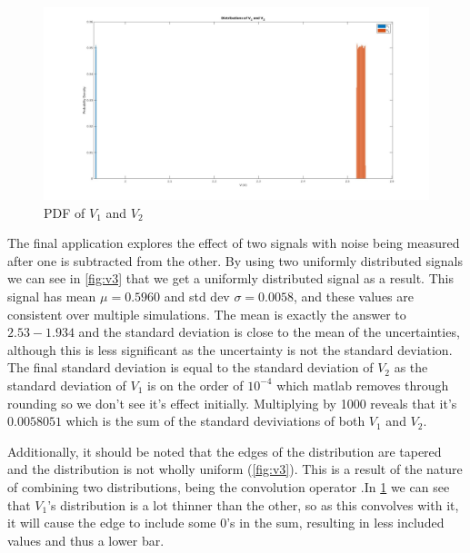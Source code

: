 \documentclass[a4paper, 12pt]{article}
\begin{document}
            \begin{figure}[!t]
                \centering
                \includegraphics[width=\textwidth]{sigDists.jpg}
                \caption{PDF of $V_1$ and $V_2$}
                \label{fig:sigDists}
            \end{figure}
            
            The final application explores the effect of two signals with noise being measured after one is subtracted from the other. By using two uniformly distributed signals we can see in \cref{fig:v3} that we get a uniformly distributed signal as a result. This signal has mean $\mu = 0.5960$ and std dev $\sigma = 0.0058$, and these values are consistent over multiple simulations. The mean is exactly the answer to $2.53-1.934$ and the standard deviation is close to the mean of the uncertainties, although this is less significant as the uncertainty is not the standard deviation. The final standard deviation is equal to the standard deviation of $V_2$ as the standard deviation of $V_1$ is on the order of $10^{-4}$ which matlab removes through rounding so we don't see it's effect initially. Multiplying by 1000 reveals that it's $0.0058051$ which is the sum of the standard deviviations of both $V_1$ and $V_2$. 

            \par 

            Additionally, it should be noted that the edges of the distribution are tapered and the distribution is not wholly uniform (\cref{fig:v3}). This is a result of the nature of combining two distributions, being the convolution operator \cite{castrup_2020}.In \cref{fig:sigDists} we can see that $V_1$'s distribution is a lot thinner than the other, so as this convolves with it, it will cause the edge to include some 0's in the sum, resulting in less included values and thus a lower bar.
\end{document}
